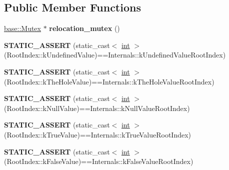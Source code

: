 \subsection*{Public Member Functions}
\begin{DoxyCompactItemize}
\item 
\mbox{\label{classv8_1_1internal_1_1Heap_a6a7c3212894575b93b301078185bf9c3}} 
\mbox{\hyperlink{classv8_1_1base_1_1Mutex}{base\+::\+Mutex}} $\ast$ {\bfseries relocation\+\_\+mutex} ()
\item 
\mbox{\label{classv8_1_1internal_1_1Heap_a09110f3b7abcaa3ad86259ebd7a6ff1e}} 
{\bfseries S\+T\+A\+T\+I\+C\+\_\+\+A\+S\+S\+E\+RT} (static\+\_\+cast$<$ \mbox{\hyperlink{classint}{int}} $>$(Root\+Index\+::k\+Undefined\+Value)==Internals\+::k\+Undefined\+Value\+Root\+Index)
\item 
\mbox{\label{classv8_1_1internal_1_1Heap_a6b16bca96aefb9143fef919e558b9705}} 
{\bfseries S\+T\+A\+T\+I\+C\+\_\+\+A\+S\+S\+E\+RT} (static\+\_\+cast$<$ \mbox{\hyperlink{classint}{int}} $>$(Root\+Index\+::k\+The\+Hole\+Value)==Internals\+::k\+The\+Hole\+Value\+Root\+Index)
\item 
\mbox{\label{classv8_1_1internal_1_1Heap_a6e199a235f8ddfd30243a21fe36bd464}} 
{\bfseries S\+T\+A\+T\+I\+C\+\_\+\+A\+S\+S\+E\+RT} (static\+\_\+cast$<$ \mbox{\hyperlink{classint}{int}} $>$(Root\+Index\+::k\+Null\+Value)==Internals\+::k\+Null\+Value\+Root\+Index)
\item 
\mbox{\label{classv8_1_1internal_1_1Heap_ac42377afa2e1bc603889b36d99766917}} 
{\bfseries S\+T\+A\+T\+I\+C\+\_\+\+A\+S\+S\+E\+RT} (static\+\_\+cast$<$ \mbox{\hyperlink{classint}{int}} $>$(Root\+Index\+::k\+True\+Value)==Internals\+::k\+True\+Value\+Root\+Index)
\item 
\mbox{\label{classv8_1_1internal_1_1Heap_ad5f9a2799282191cec61d62a4bdfbcb9}} 
{\bfseries S\+T\+A\+T\+I\+C\+\_\+\+A\+S\+S\+E\+RT} (static\+\_\+cast$<$ \mbox{\hyperlink{classint}{int}} $>$(Root\+Index\+::k\+False\+Value)==Internals\+::k\+False\+Value\+Root\+Index)
\item 
\mbox{\label{classv8_1_1internal_1_1Heap_aafb1d04518f8d51a1daf906db13ec65a}} 

\end{DoxyCompactItemize}
